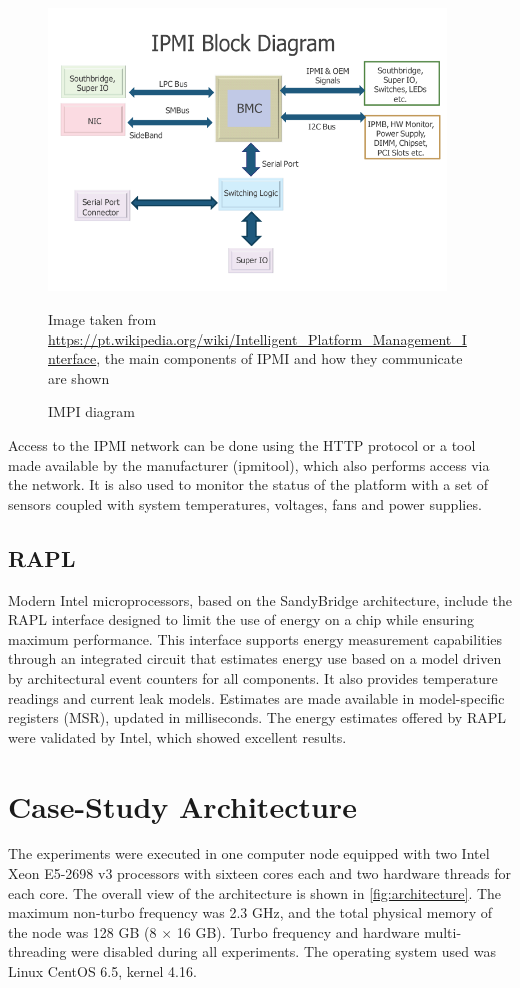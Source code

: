 \begin{figure}[H]
\centering
\includegraphics[height = 7.5cm] {intro/figures/IPMI-Block-Diagram.png}
\caption{IMPI diagram} {Image taken from \protect \url {https://pt.wikipedia.org/wiki/Intelligent_Platform_Management_Interface}, the main components of IPMI and how they communicate are shown}
\label{fig:IPMI}
\end{figure}

Access to the IPMI network can be done using the HTTP protocol or a tool made available by the manufacturer (ipmitool), which also performs access via the network. It is also used to monitor the status of the platform with a set of sensors coupled with system temperatures, voltages, fans and power supplies.

\subsection{RAPL}

Modern Intel microprocessors, based on the SandyBridge architecture, include the RAPL \cite {Rotem2012Power-managementBridge, Hahnel2012RAPL, Hackenberg2015AnProcessor} interface designed to limit the use of energy on a chip while ensuring maximum performance. This interface supports energy measurement capabilities through an integrated circuit that estimates energy use based on a model driven by architectural event counters for all components. It also provides temperature readings and current leak models. Estimates are made available in model-specific registers (MSR), updated in milliseconds. The energy estimates offered by RAPL were validated by Intel, which showed excellent results.

\section{Case-Study Architecture} \label{sec:casestudyarchitecture}
The experiments were executed in one computer node equipped with two Intel Xeon E5-2698 v3 processors with sixteen cores each and two hardware threads for each core. 
The overall view of the architecture is shown in \cref{fig:architecture}.
The maximum non-turbo frequency was 2.3 GHz, and the total physical memory of the node was 128 GB (8 $\times$ 16 GB). Turbo frequency and hardware multi-threading were disabled during all experiments. The operating system used was Linux CentOS 6.5, kernel 4.16. 

